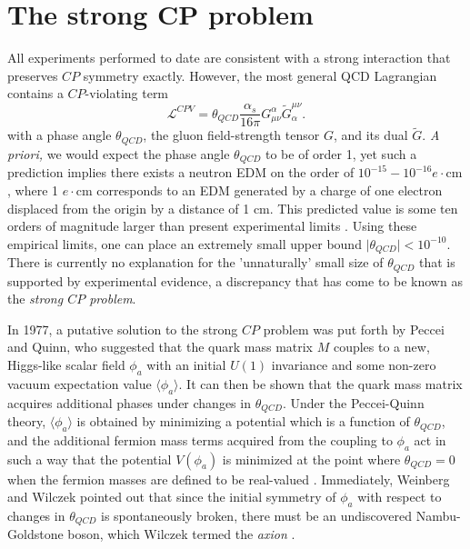 \documentclass [10pt, twoside] {uwthesis}[2012/04/02]
\begin{document}
\section{The strong CP problem} %
All experiments performed to date are consistent with a strong interaction that preserves $CP$ symmetry exactly. However, the most general QCD Lagrangian contains a $CP$-violating term \begin{equation}\mathcal{L}^{CPV}=\theta_{QCD}\dfrac{\alpha_s}{16\pi}G^{\alpha}_{\mu\nu}\tilde{G}_{\alpha}^{\mu\nu}.\end{equation} with a phase angle $\theta_{QCD}$, the gluon field-strength tensor $G$, and its dual $\tilde{G}$. \textit{A priori,} we would expect the phase angle $\theta_{QCD}$ to be of order 1, yet such a prediction implies there exists a neutron EDM on the order of $10^{-15}-10^{-16} e\cdot \text{cm}$ \cite{1979_Baluni_nEDM_from_QCD} \cite{1979_Crewther_et._al._nEDM_from_QCD}, where 1 $e\cdot \text{cm}$ corresponds to an EDM generated by a charge of one electron displaced from the origin by a distance of 1 cm. This predicted value is some ten orders of magnitude larger than present experimental limits \cite{2006_ILL_nEDM}. Using these empirical limits, one can place an extremely small upper bound $\mid\theta_{QCD}\mid < 10^{-10}.$ There is currently no explanation for the 'unnaturally' small size of  $\theta_{QCD}$ that is supported by experimental evidence, a discrepancy that has come to be known as the \textit{strong $CP$ problem}. 

In 1977, a putative solution to the strong $CP$ problem was put forth by Peccei and Quinn, who suggested that the quark mass matrix $M$ couples to a new, Higgs-like scalar field $\phi_a$ with an initial $U(1)$ invariance and some non-zero vacuum expectation value $\langle\phi_a\rangle$. It can then be shown that the quark mass matrix acquires additional phases under changes in $\theta_{QCD}$. Under the Peccei-Quinn theory, $\langle\phi_a\rangle$ is obtained by minimizing a potential which is a function of $\theta_{QCD}$, and the additional fermion mass terms acquired from the coupling to $\phi_a$ act in such a way that the potential $V(\phi_a)$ is minimized at the point where $\theta_{QCD} = 0$ when the fermion masses are defined to be real-valued \cite{1977_Peccei_Quinn}. Immediately, Weinberg and Wilczek pointed out that since the initial symmetry of $\phi_a$ with respect to changes in $\theta_{QCD}$ is spontaneously broken, there must be an undiscovered Nambu-Goldstone boson, which Wilczek termed the \textit{axion} \cite{1978_Wilczek_axion}\cite{1978_Weinberg_axion}. 
\end{document}

